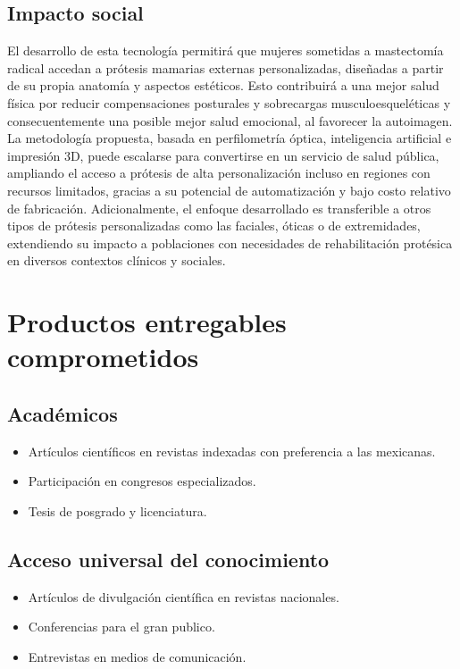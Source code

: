 \documentclass[12pt,a4paper]{article}
\begin{document}
\subsection{Impacto social}
El desarrollo de esta tecnología permitirá que mujeres sometidas a mastectomía radical accedan a prótesis mamarias externas personalizadas, diseñadas a partir de su propia anatomía y aspectos estéticos. Esto contribuirá a una mejor salud física por reducir compensaciones posturales y sobrecargas musculoesqueléticas y consecuentemente una posible mejor salud emocional, al favorecer la autoimagen. La metodología propuesta, basada en perfilometría óptica, inteligencia artificial e impresión 3D, puede escalarse para convertirse en un servicio de salud pública, ampliando el acceso a prótesis de alta personalización incluso en regiones con recursos limitados, gracias a su potencial de automatización y bajo costo relativo de fabricación. Adicionalmente, el enfoque desarrollado es transferible a otros tipos de prótesis personalizadas  como las faciales, óticas o de extremidades, extendiendo su impacto a poblaciones con necesidades de rehabilitación protésica en diversos contextos clínicos y sociales.

\section{Productos entregables comprometidos}

\subsection{Académicos}
\begin{itemize}
\item Artículos científicos en revistas indexadas con preferencia a las mexicanas.
\item Participación en congresos especializados.
\item Tesis de posgrado y licenciatura.
\end{itemize}

\subsection{Acceso universal del conocimiento}
\begin{itemize}
\item Artículos de divulgación científica en revistas nacionales.
\item Conferencias para el gran publico.
\item Entrevistas en medios de comunicación.
\end{itemize}
\end{document}
